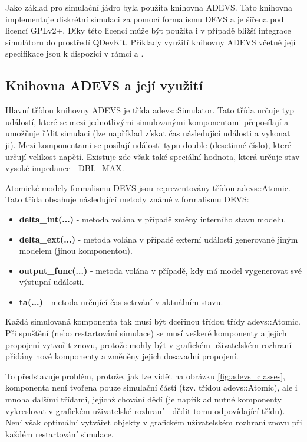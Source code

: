 Jako základ pro simulační jádro byla použita knihovna ADEVS. Tato knihovna implementuje diskrétní simulaci za pomocí formalismu DEVS a je šířena pod licencí GPLv2+. Díky této licenci může být použita i v případě bližší integrace simulátoru do prostředí QDevKit. Příklady využití knihovny ADEVS včetně její specifikace jsou k dispozici v rámci \cite{nutaro} a \cite{adevs}.

\subsection{Knihovna ADEVS a její využití}

Hlavní třídou knihovny ADEVS je třída adevs::Simulator. Tato třída určuje typ událostí, které se mezi jednotlivými simulovanými komponentami přeposílají a umožňuje řídit simulaci (lze například získat čas následující události a vykonat ji). Mezi komponentami se posílají události typu double (desetinné číslo),  které určují velikost napětí. Existuje zde však také speciální hodnota, která určuje stav vysoké impedance - DBL\_MAX.

Atomické modely formalismu DEVS jsou reprezentovány třídou adevs::Atomic. Tato třída obsahuje následující metody známé z formalismu DEVS:

\begin{itemize}
\item \textbf{delta\_int(...)} - metoda volána v případě změny interního stavu modelu.
\item \textbf{delta\_ext(...)} - metoda volána v případě externí události generované jiným modelem (jinou komponentou).
\item \textbf{output\_func(...)} - metoda volána v případě, kdy má model vygenerovat své výstupní události.
\item \textbf{ta(...)} - metoda určující čas setrvání v aktuálním stavu.
\end{itemize}

Každá simulovaná komponenta tak musí být dceřinou třídou třídy adevs::Atomic. Při spuštění (nebo restartování simulace) se musí veškeré komponenty a jejich propojení vytvořit znovu, protože mohly být v grafickém uživatelském rozhraní přidány nové komponenty a změněny jejich dosavadní propojení.

To představuje problém, protože, jak lze vidět na obrázku \ref{fig:adevs_classes}, komponenta není tvořena pouze simulační částí (tzv. třídou adevs::Atomic), ale i mnoha dalšími třídami, jejichž chování dědí (je například nutné komponenty vykreslovat v grafickém uživatelské rozhraní - dědit tomu odpovídající třídu). Není však optimální vytvářet objekty v grafickém uživatelském rozhraní znovu při každém restartování simulace.


